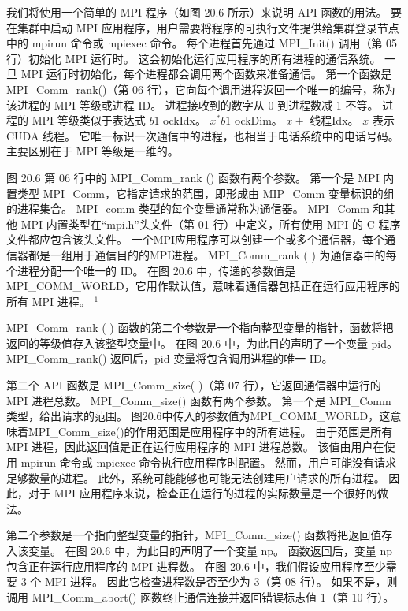 我们将使用一个简单的 MPI 程序（如图 20.6 所示）来说明 API 函数的用法。 
要在集群中启动 MPI 应用程序，用户需要将程序的可执行文件提供给集群登录节点中的 mpirun 命令或 mpiexec 命令。 
每个进程首先通过 MPI\_Init() 调用（第 05 行）初始化 MPI 运行时。 这会初始化运行应用程序的所有进程的通信系统。 
一旦 MPI 运行时初始化，每个进程都会调用两个函数来准备通信。 
第一个函数是 MPI\_Comm\_rank()（第 06 行），它向每个调用进程返回一个唯一的编号，称为该进程的 MPI 等级或进程 ID。 
进程接收到的数字从 0 到进程数减 1 不等。 进程的 MPI 等级类似于表达式 $b 1$ ockIdx。 $x^{*} b 1$ ockDim。 
$x+$ 线程Idx。 $x$ 表示 CUDA 线程。 它唯一标识一次通信中的进程，也相当于电话系统中的电话号码。 
主要区别在于 MPI 等级是一维的。

图 20.6 第 06 行中的 MPI\_Comm\_rank () 函数有两个参数。
 第一个是 MPI 内置类型 MPI\_Comm，它指定请求的范围，即形成由 MIP\_Comm 变量标识的组的进程集合。 
 MPI\_comm 类型的每个变量通常称为通信器。 
 MPI\_Comm 和其他 MPI 内置类型在“mpi.h”头文件（第 01 行）中定义，所有使用 MPI 的 C 程序文件都应包含该头文件。 
 一个MPI应用程序可以创建一个或多个通信器，每个通信器都是一组用于通信目的的MPI进程。 
 MPI\_Comm\_rank ( ) 为通信器中的每个进程分配一个唯一的 ID。 
 在图 20.6 中，传递的参数值是 MPI\_COMM\_WORLD，它用作默认值，意味着通信器包括正在运行应用程序的所有 MPI 进程。 
 ${ }^{1}$

MPI\_Comm\_rank ( ) 函数的第二个参数是一个指向整型变量的指针，函数将把返回的等级值存入该整型变量中。 
在图 20.6 中，为此目的声明了一个变量 pid。 MPI\_Comm\_rank() 返回后，pid 变量将包含调用进程的唯一 ID。

第二个 API 函数是 MPI\_Comm\_size( )（第 07 行），它返回通信器中运行的 MPI 进程总数。 
MPI\_Comm\_size() 函数有两个参数。 第一个是 MPI\_Comm 类型，给出请求的范围。 
图20.6中传入的参数值为MPI\_COMM\_WORLD，这意味着MPI\_Comm\_size()的作用范围是应用程序中的所有进程。 
由于范围是所有 MPI 进程，因此返回值是正在运行应用程序的 MPI 进程总数。 
该值由用户在使用 mpirun 命令或 mpiexec 命令执行应用程序时配置。 然而，用户可能没有请求足够数量的进程。 
此外，系统可能能够也可能无法创建用户请求的所有进程。 
因此，对于 MPI 应用程序来说，检查正在运行的进程的实际数量是一个很好的做法。

第二个参数是一个指向整型变量的指针，MPI\_Comm\_size() 函数将把返回值存入该变量。 
在图 20.6 中，为此目的声明了一个变量 np。 函数返回后，变量 np 包含正在运行应用程序的 MPI 进程数。 
在图 20.6 中，我们假设应用程序至少需要 3 个 MPI 进程。 因此它检查进程数是否至少为 3（第 08 行）。 
如果不是，则调用 MPI\_Comm\_abort() 函数终止通信连接并返回错误标志值 1（第 10 行）。

